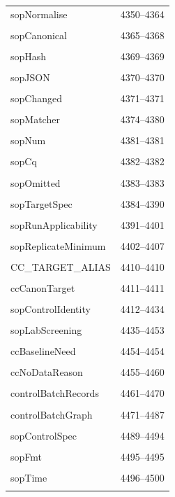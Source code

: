 {\begin{longtable}{@{}p{11cm}r@{}}
sopNormalise & 4350--4364 \\\\\hline
sopCanonical & 4365--4368 \\\\\hline
sopHash & 4369--4369 \\\\\hline
sopJSON & 4370--4370 \\\\\hline
sopChanged & 4371--4371 \\\\\hline
sopMatcher & 4374--4380 \\\\\hline
sopNum & 4381--4381 \\\\\hline
sopCq & 4382--4382 \\\\\hline
sopOmitted & 4383--4383 \\\\\hline
sopTargetSpec & 4384--4390 \\\\\hline
sopRunApplicability & 4391--4401 \\\\\hline
sopReplicateMinimum & 4402--4407 \\\\\hline
CC\_TARGET\_ALIAS & 4410--4410 \\\\\hline
ccCanonTarget & 4411--4411 \\\\\hline
sopControlIdentity & 4412--4434 \\\\\hline
sopLabScreening & 4435--4453 \\\\\hline
ccBaselineNeed & 4454--4454 \\\\\hline
ccNoDataReason & 4455--4460 \\\\\hline
controlBatchRecords & 4461--4470 \\\\\hline
controlBatchGraph & 4471--4487 \\\\\hline
sopControlSpec & 4489--4494 \\\\\hline
sopFmt & 4495--4495 \\\\\hline
sopTime & 4496--4500 \\\\\hline

\end{longtable}}
